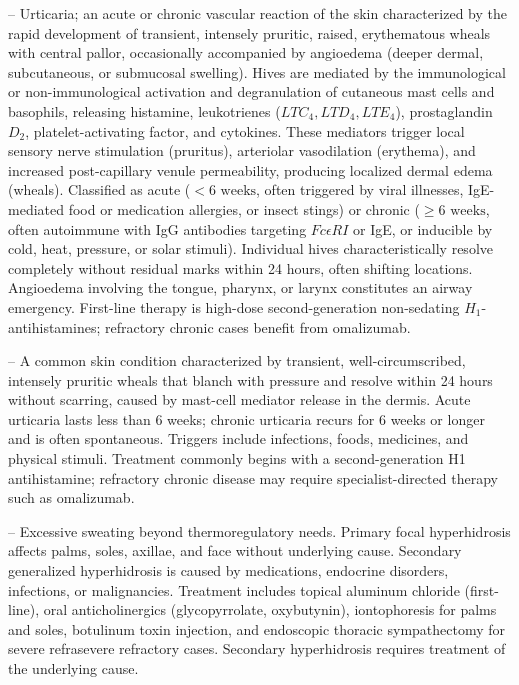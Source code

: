 -- Urticaria; an acute or chronic vascular reaction of the skin characterized by the rapid development of transient, intensely pruritic, raised, erythematous wheals with central pallor, occasionally accompanied by angioedema (deeper dermal, subcutaneous, or submucosal swelling). Hives are mediated by the immunological or non-immunological activation and degranulation of cutaneous mast cells and basophils, releasing histamine, leukotrienes ($LTC_4, LTD_4, LTE_4$), prostaglandin $D_2$, platelet-activating factor, and cytokines. These mediators trigger local sensory nerve stimulation (pruritus), arteriolar vasodilation (erythema), and increased post-capillary venule permeability, producing localized dermal edema (wheals). Classified as acute ($<6\text{ weeks}$, often triggered by viral illnesses, IgE-mediated food or medication allergies, or insect stings) or chronic ($\ge 6\text{ weeks}$, often autoimmune with IgG antibodies targeting $Fc\epsilon RI$ or IgE, or inducible by cold, heat, pressure, or solar stimuli). Individual hives characteristically resolve completely without residual marks within 24 hours, often shifting locations. Angioedema involving the tongue, pharynx, or larynx constitutes an airway emergency. First-line therapy is high-dose second-generation non-sedating $H_1$-antihistamines; refractory chronic cases benefit from omalizumab.

-- A common skin condition characterized by transient, well-circumscribed, intensely pruritic wheals that blanch with pressure and resolve within 24 hours without scarring, caused by mast-cell mediator release in the dermis. Acute urticaria lasts less than 6 weeks; chronic urticaria recurs for 6 weeks or longer and is often spontaneous. Triggers include infections, foods, medicines, and physical stimuli. Treatment commonly begins with a second-generation H1 antihistamine; refractory chronic disease may require specialist-directed therapy such as omalizumab.

-- Excessive sweating beyond thermoregulatory needs. Primary focal hyperhidrosis affects palms, soles, axillae, and face without underlying cause. Secondary generalized hyperhidrosis is caused by medications, endocrine disorders, infections, or malignancies. Treatment includes topical aluminum chloride (first-line), oral anticholinergics (glycopyrrolate, oxybutynin), iontophoresis for palms and soles, botulinum toxin injection, and endoscopic thoracic sympathectomy for severe refrasevere refractory cases. Secondary hyperhidrosis requires treatment of the underlying cause.

